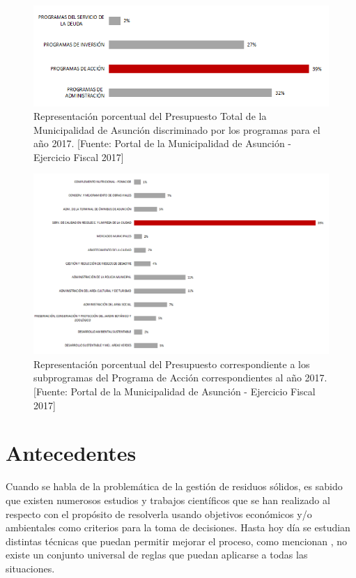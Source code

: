 \begin{figure}[H]
    \centering
    \includegraphics[width=14.5cm]{20181119_PresupuestoTotal2017.png}
    \caption{Representación porcentual del Presupuesto Total de la Municipalidad de Asunción discriminado por los programas para el año 2017. [Fuente: Portal de la Municipalidad de Asunción - Ejercicio Fiscal 2017]}
    \label{fig:porcentajePresupuesto}
\end{figure}

\begin{figure}[H]
    \centering
    \includegraphics[width=15cm]{20181119_PresupuestoAccion2017.png}
    \caption{ Representación porcentual del Presupuesto correspondiente a los subprogramas del Programa de Acción correspondientes al año 2017. [Fuente: Portal de la Municipalidad de Asunción - Ejercicio Fiscal 2017]}
    \label{fig:programaAccion}
\end{figure}

\section{Antecedentes}

Cuando se habla de la problemática de la gestión de residuos sólidos, es sabido que existen numerosos estudios y trabajos científicos que se han realizado al respecto con el propósito de resolverla usando objetivos económicos y/o ambientales como criterios para la toma de decisiones. Hasta hoy día se estudian distintas técnicas que puedan permitir mejorar el proceso, como mencionan  \citet{Tchobanoglous1993IntegratedIssues}, no existe un conjunto universal de reglas que puedan aplicarse a todas las situaciones.

